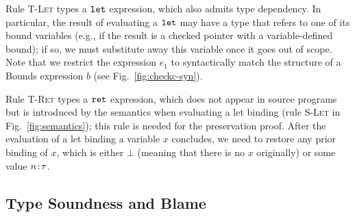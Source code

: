 Rule \textsc{T-Let} types a $\mathtt{let}$ expression, which also admits
type dependency. In particular, the result of evaluating a $\mathtt{let}$
may have a type that refers to one of its bound variables (e.g., if
the result is a checked pointer with a variable-defined bound); if so,
we must substitute away this variable once it goes out of scope. Note
that we restrict the expression $e_1$ to syntactically match the
structure of a Bounds expression $b$ (see Fig.~\ref{fig:checkc-syn}).

Rule \textsc{T-Ret} types a $\mathtt{ret}$ expression, which does not
appear in source programs but is introduced by the semantics when
evaluating a let binding (rule \textsc{S-Let} in
Fig.~\ref{fig:semantics}); this rule is needed for the preservation
proof. After the evaluation of a let binding a variable $x$ concludes,
we need to restore any prior binding of $x$, which is either
$\bot$ (meaning that there is no $x$ originally) or some value
${n}\!:\!{\tau}$.

\subsection{Type Soundness and Blame}\label{sec:theorem}

